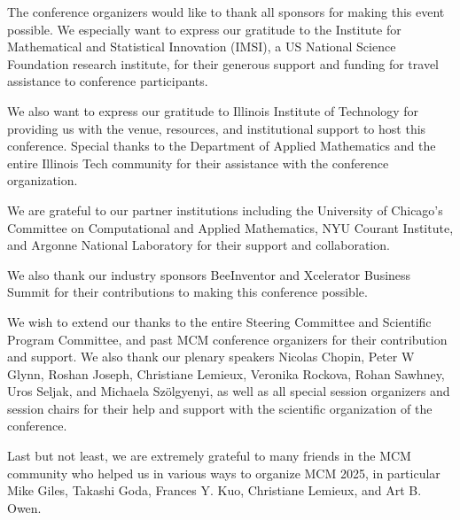 The conference organizers would like to thank all sponsors for making this
event possible. We especially want to express our gratitude to the Institute for Mathematical and Statistical Innovation (IMSI), a US National Science Foundation research institute, for their generous support and funding for travel assistance to conference participants.

We also want to express our gratitude to Illinois Institute of Technology for providing us with the venue, resources, and institutional support to host this conference. Special thanks to the Department of Applied Mathematics and the entire Illinois Tech community for their assistance with the conference organization.

We are grateful to our partner institutions including the University of Chicago's Committee on Computational and Applied Mathematics, NYU Courant Institute, and Argonne National Laboratory for their support and collaboration.

We also thank our industry sponsors BeeInventor and Xcelerator Business Summit for their contributions to making this conference possible.

We wish to extend our thanks to the entire Steering Committee and
Scientific Program Committee, and past MCM conference organizers for their
contribution and support. We also thank our plenary speakers Nicolas Chopin, Peter W Glynn, Roshan Joseph, Christiane Lemieux, Veronika Rockova, Rohan Sawhney, Uros Seljak, and Michaela Szölgyenyi, as well as all special session organizers and session chairs for their help and support with the scientific organization of the conference.

Last but not least, we are extremely grateful to many friends in the MCM community 
who helped us in various ways to organize MCM 2025, in particular Mike Giles, 
Takashi Goda, Frances Y. Kuo, Christiane Lemieux, and Art B. Owen. 

\clearpage

